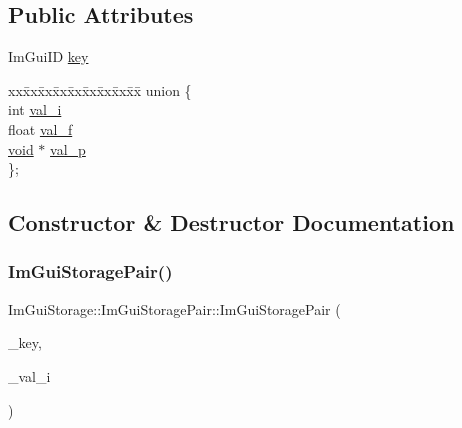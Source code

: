 \subsection*{Public Attributes}
\begin{DoxyCompactItemize}
\item 
Im\+Gui\+ID \hyperlink{structImGuiStorage_1_1ImGuiStoragePair_a12f78b9d0f5de30615c9493f58f69e71}{key}
\item 
\begin{tabbing}
xx\=xx\=xx\=xx\=xx\=xx\=xx\=xx\=xx\=\kill
union \{\\
\>int \hyperlink{structImGuiStorage_1_1ImGuiStoragePair_ada14150f288132afbf2138ad8d9f721a}{val\_i}\\
\>float \hyperlink{structImGuiStorage_1_1ImGuiStoragePair_a600368daba0ffede52def40b10bdbd4f}{val\_f}\\
\>\hyperlink{imgui__impl__opengl3__loader_8h_ac668e7cffd9e2e9cfee428b9b2f34fa7}{void} $\ast$ \hyperlink{structImGuiStorage_1_1ImGuiStoragePair_a9b0963410770bb225b1eef58d89ba2ec}{val\_p}\\
\}; \\

\end{tabbing}\end{DoxyCompactItemize}


\subsection{Constructor \& Destructor Documentation}
\mbox{\label{structImGuiStorage_1_1ImGuiStoragePair_a8e8914f5b7b84d159ed26ff91881282d}} 
\subsubsection{\texorpdfstring{Im\+Gui\+Storage\+Pair()}{ImGuiStoragePair()}\hspace{0.1cm}{\footnotesize\ttfamily [1/3]}}
{\footnotesize\ttfamily Im\+Gui\+Storage\+::\+Im\+Gui\+Storage\+Pair\+::\+Im\+Gui\+Storage\+Pair (\begin{DoxyParamCaption}\item[{Im\+Gui\+ID}]{\+\_\+key,  }\item[{int}]{\+\_\+val\+\_\+i }\end{DoxyParamCaption})\hspace{0.3cm}{\ttfamily [inline]}}

